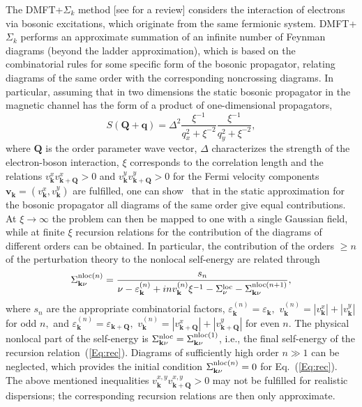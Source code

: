 \documentclass[rmp,aps,reprint,amsmath,amssymb,superscriptaddress,showpacs,nofootinbib]{revtex4-1}
\begin{document}
The DMFT+$\Sigma_{k}$ method [see  for a review] considers the interaction of electrons via bosonic excitations, which originate from the same fermionic system. DMFT+$\Sigma_k$  performs an approximate summation of an infinite number of Feynman diagrams (beyond the ladder approximation), which is based on the combinatorial rules for some specific form of the bosonic propagator, relating diagrams of the same order with the corresponding noncrossing diagrams. In particular, assuming that in two dimensions the
static bosonic propagator in the magnetic channel  has the form of a product of one-dimensional propagators,%
\begin{equation}
  S(\mathbf{Q}+\mathbf{q})=\Delta ^{2}\frac{\xi ^{-1}}{q_{x}^{2}+\xi ^{-2}}%
  \frac{\xi ^{-1}}{q_{y}^{2}+\xi ^{-2}},
\end{equation}%
where $\mathbf{Q}$ is the order parameter wave vector, $\Delta $ characterizes the strength of the electron-boson interaction, $\xi$ corresponds to the correlation length and the relations $v_{\mathbf{k}}^{x}v_{\mathbf{k}+\mathbf{Q}}^{x}>0$ and $v_{\mathbf{k}}^{y}v_{\mathbf{k}+\mathbf{Q}}^{y}>0$ for the Fermi velocity components $\mathbf{v}_{\mathbf{k}}=(v_{\mathbf{k}}^{x},v_{\mathbf{k}}^{y})$ are fulfilled, one can show~\cite{Schmalian1999,Sadovskii1999} that in the static approximation for the bosonic propagator all diagrams of the same order give equal contributions. At $\xi \rightarrow \infty $ the problem can then be mapped to one with a single Gaussian field, while at finite $\xi $ recursion relations for the contribution of the diagrams of different orders can be obtained. In particular, the contribution of the orders $\geq n$ of the perturbation theory to the nonlocal self-energy are related through~\cite{Sadovskii1999,Sadovskii2005} 
\begin{equation}
\label{Eq:rec}
  \Sigma_{\mathbf{k}\nu}^{{\rm nloc}(n)}=\frac{s_{n}}{\nu-\varepsilon _{\mathbf{k}}^{(n)}+i n v_{\mathbf{k}}^{(n)}\xi ^{-1}-\Sigma
  ^{\mathrm{loc}}_\nu-{\Sigma}_{\mathbf{k}\nu}^{{\rm nloc}(n+1)}},
\end{equation}%
where $s_{n}$ are the appropriate combinatorial factors, $\varepsilon _{\mathbf{k}}^{(n)}=\varepsilon _{\mathbf{k}},$ $v_{\mathbf{k}}^{(n)}=|v_{\mathbf{k}}^{x}|+|v_{\mathbf{k}}^{y}|$ for odd $n,$ and $\varepsilon _{\mathbf{k}}^{(n)}=\varepsilon _{\mathbf{k+Q}},$ $v_{\mathbf{k}}^{(n)}=|v_{\mathbf{k+Q}}^{x}|+|v_{\mathbf{k+Q}}^{y}|$ for even $n.$ The physical nonlocal part of the self-energy is $\Sigma^{\rm nloc}_{\mathbf{k}\nu}=\Sigma_{\mathbf{k}\nu }^{{\rm nloc}(1)}$, i.e., the final self-energy of the recursion relation~(\ref{Eq:rec}). Diagrams of sufficiently high order $n\gg 1$ can be neglected, which provides the initial condition $\Sigma_{\mathbf{k}\nu}^{{\rm nloc}(n)}=0$ for Eq.~(\ref{Eq:rec}). The above mentioned inequalities $v_{\mathbf{k}}^{x,y}v_{\mathbf{k}+\mathbf{Q}}^{x,y}>0$ may not be fulfilled for realistic dispersions; the corresponding recursion relations are then  only approximate.
\end{document}
